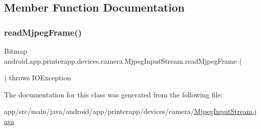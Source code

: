 \subsection{Member Function Documentation}
\mbox{\label{classandroid_1_1app_1_1printerapp_1_1devices_1_1camera_1_1_mjpeg_input_stream_a67054c1cdfe39f85d243092d00b381b6}} 
\subsubsection{\texorpdfstring{read\+Mjpeg\+Frame()}{readMjpegFrame()}}
{\footnotesize\ttfamily Bitmap android.\+app.\+printerapp.\+devices.\+camera.\+Mjpeg\+Input\+Stream.\+read\+Mjpeg\+Frame (\begin{DoxyParamCaption}{ }\end{DoxyParamCaption}) throws I\+O\+Exception}



The documentation for this class was generated from the following file\+:\begin{DoxyCompactItemize}
\item 
app/src/main/java/android/app/printerapp/devices/camera/\hyperlink{_mjpeg_input_stream_8java}{Mjpeg\+Input\+Stream.\+java}\end{DoxyCompactItemize}
